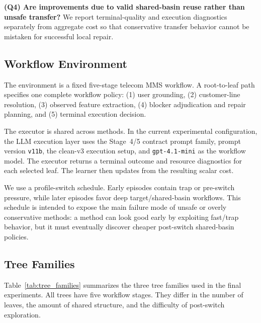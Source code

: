 \textbf{(Q4) Are improvements due to valid shared-basin reuse rather than unsafe transfer?}
We report terminal-quality and execution diagnostics separately from aggregate cost so that conservative transfer behavior cannot be mistaken for successful local repair.

\subsection{Workflow Environment}
\label{sec:exp_workflow_env}

The environment is a fixed five-stage telecom MMS workflow. A root-to-leaf path specifies one complete workflow policy:
(1) user grounding,
(2) customer-line resolution,
(3) observed feature extraction,
(4) blocker adjudication and repair planning, and
(5) terminal execution decision.

The executor is shared across methods. In the current experimental configuration, the LLM execution layer uses the Stage~4/5 contract prompt family, prompt version \texttt{v11b}, the clean-v3 execution setup, and \texttt{gpt-4.1-mini} as the workflow model. The executor returns a terminal outcome and resource diagnostics for each selected leaf. The learner then updates from the resulting scalar cost.

We use a profile-switch schedule. Early episodes contain trap or pre-switch pressure, while later episodes favor deep target/shared-basin workflows. This schedule is intended to expose the main failure mode of unsafe or overly conservative methods: a method can look good early by exploiting fast/trap behavior, but it must eventually discover cheaper post-switch shared-basin policies.

\subsection{Tree Families}
\label{sec:exp_tree_families}

Table~\ref{tab:tree_families} summarizes the three tree families used in the final experiments. All trees have five workflow stages. They differ in the number of leaves, the amount of shared structure, and the difficulty of post-switch exploration.

